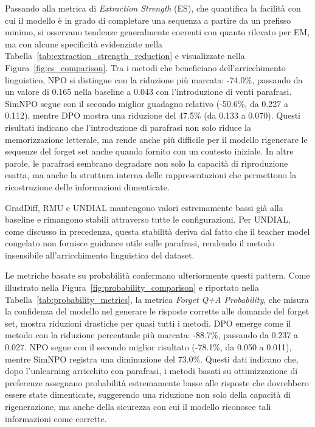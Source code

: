 Passando alla metrica di \textit{Extraction Strength} (ES), che quantifica la facilità con cui il modello è in grado di completare una sequenza a partire da un prefisso minimo, si osservano tendenze generalmente coerenti con quanto rilevato per EM, ma con alcune specificità evidenziate nella Tabella~\ref{tab:extraction_strength_reduction} e visualizzate nella Figura~\ref{fig:es_comparison}. Tra i metodi che beneficiano dell'arricchimento linguistico, NPO si distingue con la riduzione più marcata: -74.0\%, passando da un valore di 0.165 nella baseline a 0.043 con l'introduzione di venti parafrasi. SimNPO segue con il secondo miglior guadagno relativo (-50.6\%, da 0.227 a 0.112), mentre DPO mostra una riduzione del 47.5\% (da 0.133 a 0.070). Questi risultati indicano che l'introduzione di parafrasi non solo riduce la memorizzazione letterale, ma rende anche più difficile per il modello rigenerare le sequenze del forget set anche quando fornito con un contesto iniziale. In altre parole, le parafrasi sembrano degradare non solo la capacità di riproduzione esatta, ma anche la struttura interna delle rappresentazioni che permettono la ricostruzione delle informazioni dimenticate.

GradDiff, RMU e UNDIAL mantengono valori estremamente bassi già alla baseline e rimangono stabili attraverso tutte le configurazioni. Per UNDIAL, come discusso in precedenza, questa stabilità deriva dal fatto che il teacher model congelato non fornisce guidance utile sulle parafrasi, rendendo il metodo insensibile all'arricchimento linguistico del dataset.

Le metriche basate su probabilità confermano ulteriormente questi pattern. Come illustrato nella Figura~\ref{fig:probability_comparison} e riportato nella Tabella~\ref{tab:probability_metrics}, la metrica \textit{Forget Q+A Probability}, che misura la confidenza del modello nel generare le risposte corrette alle domande del forget set, mostra riduzioni drastiche per quasi tutti i metodi. DPO emerge come il metodo con la riduzione percentuale più marcata: -88.7\%, passando da 0.237 a 0.027. NPO segue con il secondo miglior risultato (-78.1\%, da 0.050 a 0.011), mentre SimNPO registra una diminuzione del 73.0\%. Questi dati indicano che, dopo l'unlearning arricchito con parafrasi, i metodi basati su ottimizzazione di preferenze assegnano probabilità estremamente basse alle risposte che dovrebbero essere state dimenticate, suggerendo una riduzione non solo della capacità di rigenerazione, ma anche della sicurezza con cui il modello riconosce tali informazioni come corrette.

